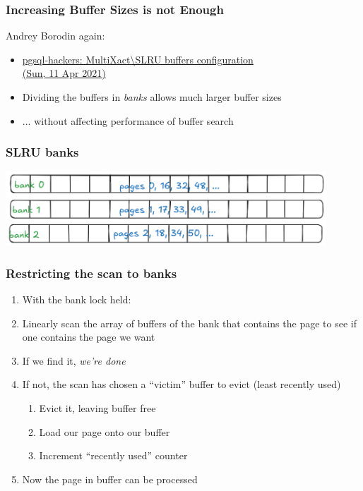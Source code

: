 \begin{frame}
  \frametitle{Increasing Buffer Sizes is not Enough}
  Andrey Borodin again:
  \begin{itemize}
    \item {\linksize \href{https://postgr.es/m/494C5E7F-E410-48FA-A93E-F7723D859561@yandex-team.ru}
      {pgsql-hackers: MultiXact\textbackslash{}SLRU buffers configuration \faExternalLink\\ (Sun, 11 Apr 2021)}}

    \item Dividing the buffers in \emph{banks} allows much larger buffer sizes
    \item ... without affecting performance of buffer search
  \end{itemize}
\end{frame}

\begin{frame}
  \frametitle{SLRU banks}
  \includegraphics[width=0.9\textwidth]{banks.png}
\end{frame}

\begin{frame}
  \frametitle{Restricting the scan to banks}
  \begin{enumerate}
    \item \alert{With the bank lock held:}
    \item Linearly scan the array of buffers \alert{of the bank that contains the page} to see if one contains the page we want
    \item If we find it, \emph{we're done}
    \item If not, the scan has chosen a ``victim'' buffer to evict (least recently used)
      \begin{enumerate}
	\item Evict it, leaving buffer free
	\item Load our page onto our buffer
	\item Increment ``recently used'' counter
      \end{enumerate}
    \item Now the page in buffer can be processed 
  \end{enumerate}
\end{frame}


